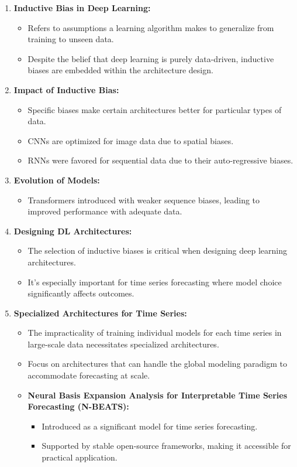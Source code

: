 \documentclass{article}
\begin{document}
\begin{enumerate}
    \item \textbf{Inductive Bias in Deep Learning:}
    \begin{itemize}
        \item Refers to assumptions a learning algorithm makes to generalize from training to unseen data.
        \item Despite the belief that deep learning is purely data-driven, inductive biases are embedded within the architecture design.
    \end{itemize}
    
    \item \textbf{Impact of Inductive Bias:}
    \begin{itemize}
        \item Specific biases make certain architectures better for particular types of data.
        \item CNNs are optimized for image data due to spatial biases.
        \item RNNs were favored for sequential data due to their auto-regressive biases.
    \end{itemize}
    
    \item \textbf{Evolution of Models:}
    \begin{itemize}
        \item Transformers introduced with weaker sequence biases, leading to improved performance with adequate data.
    \end{itemize}
    
    \item \textbf{Designing DL Architectures:}
    \begin{itemize}
        \item The selection of inductive biases is critical when designing deep learning architectures.
        \item It's especially important for time series forecasting where model choice significantly affects outcomes.
    \end{itemize}
    
    \item \textbf{Specialized Architectures for Time Series:}
    \begin{itemize}
        \item The impracticality of training individual models for each time series in large-scale data necessitates specialized architectures.
        \item Focus on architectures that can handle the global modeling paradigm to accommodate forecasting at scale.
        \item \textbf{Neural Basis Expansion Analysis for Interpretable Time Series Forecasting (N-BEATS):}
        \begin{itemize}
            \item Introduced as a significant model for time series forecasting.
            \item Supported by stable open-source frameworks, making it accessible for practical application.
        \end{itemize}
    \end{itemize}
    

\end{enumerate}
\end{document}
